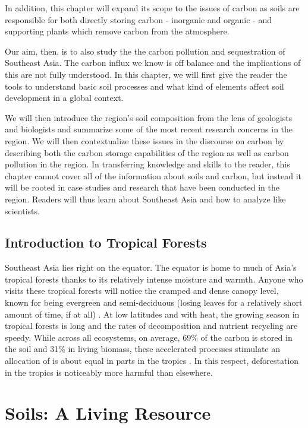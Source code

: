 In addition, this chapter will expand its scope to the issues of carbon as soils are responsible for both directly storing carbon - inorganic and organic - and supporting plants which remove carbon from the atmosphere. 

Our aim, then, is to also study the the carbon pollution and sequestration of Southeast Asia. The carbon influx we know is off balance and the implications of this are not fully understood. In this chapter, we will first give the reader the tools to understand basic soil processes and what kind of elements affect soil development in a global context. 

We will then introduce the region's soil composition from the lens of geologists and biologists and summarize some of the most recent research concerns in the region. We will then contextualize these issues in the discourse on carbon by describing both the carbon storage capabilities of the region as well as carbon pollution in the region. In transferring knowledge and skills to the reader, this chapter cannot cover all of the information about soils and carbon, but instead it will be rooted in case studies and research that have been conducted in the region. Readers will thus learn about Southeast Asia and how to analyze like scientists. 

\subsection{Introduction to Tropical Forests}
Southeast Asia lies right on the equator. The equator is home to much of Asia's tropical forests thanks to its relatively intense moisture and warmth. Anyone who visits these tropical forests will notice the cramped and dense canopy level, known for being evergreen and semi-deciduous (losing leaves for a relatively short amount of time, if at all) \citep{lieth2012tropical}. At low latitudes and with heat, the growing season in tropical forests is long and the rates of decomposition and nutrient recycling are speedy. While across all ecosystems, on average, 69\% of the carbon is stored in the soil and 31\% in living biomass, these accelerated processes stimulate an allocation of is about equal in parts in the tropics \citep{dixon1994carbon}. In this respect, deforestation in the tropics is noticeably more harmful than elsewhere.



\section{Soils: A Living Resource}

